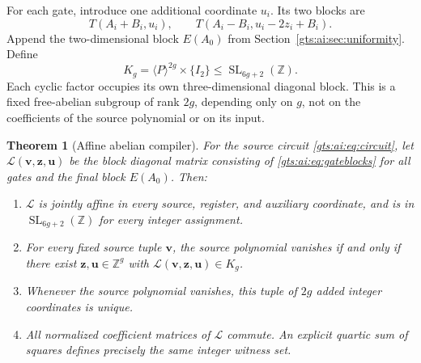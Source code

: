 \documentclass[11pt,letterpaper]{article}
\newtheorem{theorem}{Theorem}[section]
\theoremstyle{definition}
\theoremstyle{remark}
\newcommand{\Z}{\mathbb Z}
\newcommand{\SL}{\operatorname{SL}}
\begin{document}
For each gate, introduce one additional coordinate $u_i$. Its two blocks are
\begin{equation}\label{gts:ai:eq:gateblocks}
 T(A_i+B_i,u_i),\qquad
 T(A_i-B_i,u_i-2z_i+B_i).
\end{equation}
Append the two-dimensional block $E(A_0)$ from Section~\ref{gts:ai:sec:uniformity}. Define
\begin{equation}\label{gts:ai:eq:Kg}
 K_g=\langle P\rangle^{2g}\times\{I_2\}
       \le\SL_{6g+2}(\Z).
\end{equation}
Each cyclic factor occupies its own three-dimensional diagonal block. This is a fixed free-abelian subgroup of rank $2g$, depending only on $g$, not on the coefficients of the source polynomial or on its input.

\begin{theorem}[Affine abelian compiler]\label{gts:ai:thm:compiler}
For the source circuit \eqref{gts:ai:eq:circuit}, let $\mathcal L(\mathbf v,\mathbf z,\mathbf u)$ be the block diagonal matrix consisting of \eqref{gts:ai:eq:gateblocks} for all gates and the final block $E(A_0)$. Then:
\begin{enumerate}[label=\textnormal{(\roman*)}]
\item $\mathcal L$ is jointly affine in every source, register, and auxiliary coordinate, and is in $\SL_{6g+2}(\Z)$ for every integer assignment.
\item For every fixed source tuple $\mathbf v$, the source polynomial vanishes if and only if there exist $\mathbf z,\mathbf u\in\Z^g$ with $\mathcal L(\mathbf v,\mathbf z,\mathbf u)\in K_g$.
\item Whenever the source polynomial vanishes, this tuple of $2g$ added integer coordinates is unique.
\item All normalized coefficient matrices of $\mathcal L$ commute. An explicit quartic sum of squares defines precisely the same integer witness set.
\end{enumerate}
\end{theorem}
\end{document}
